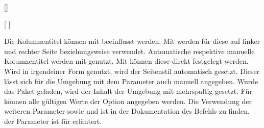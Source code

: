 \begin{Declaration*}{}
\begin{Declaration*}{}
\begin{Declaration*}{}
\begin{Declaration}{[]}
\begin{Declaration}{%
  [%
  ]%
}
\begin{Declaration}{}
\begin{Declaration}{}
\begin{Declaration}{%
}
\begin{Declaration}{%
}
\begin{Declaration}{}
\begin{Declaration}{%
}
\begin{Declaration}{}
\begin{Declaration}{}
\begin{Declaration}{}
Die Kolumnentitel können mit  
beeinflusst werden. Mit  werden 
für diese auf linker und rechter Seite  beziehungsweise
 verwendet. Automatische respektive manuelle Kolumnentitel 
werden mit  genutzt. Mit 
 können 
diese direkt festgelegt werden. Wird  
in irgendeiner Form genutzt, wird der Seitenstil  
automatisch gesetzt. Dieser lässt sich für die Umgebung mit dem Parameter 
 auch manuell angegeben. Wurde das 
Paket  geladen, wird der Inhalt der Umgebung mit 
 mehrspaltig gesetzt. 
Für  können alle gültigen Werte der 
Option  angegeben werden. Die Verwendung der weiteren 
Parameter  sowie 
 und  ist 
in der Dokumentation des Befehls  zu finden, der Parameter 
 ist für  erläutert.
\end{Declaration}
\end{Declaration}
\end{Declaration}
\end{Declaration}
\end{Declaration}
\end{Declaration}
\end{Declaration}
\end{Declaration}
\end{Declaration}
\end{Declaration}
\end{Declaration}


\end{Declaration*}
\end{Declaration*}
\end{Declaration*}
